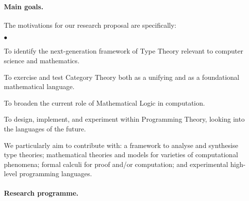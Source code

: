 \documentclass[11pt,twocolumn]{article}
\newenvironment{myitemize}
  {\begin{list}{$\bullet$}
  {\setlength{\topsep}{1pt}
   \setlength{\partopsep}{1pt}
   \setlength{\itemsep}{0pt}
   \setlength{\parsep}{0pt}
   \setlength{\leftmargin}{1em}
   \setlength{\labelwidth}{.5em}}}
  {\end{list}}
\begin{document}
\paragraph*{Main goals.}

The motivations for our research proposal are specifically: 
\begin{myitemize}
\item[\raisebox{.75mm}{\tiny$\bigstar$}]\hspace*{-2mm}
  To identify the next-generation framework of Type Theory relevant to
  computer science and mathematics.
\item[\raisebox{.75mm}{\tiny$\bigstar$}]\hspace*{-2mm}
  To exercise and test Category Theory both as a unifying and as a
  foundational mathematical language.
\item[\raisebox{.75mm}{\tiny$\bigstar$}]\hspace*{-2mm}
  To broaden the current role of Mathematical Logic in computation.
\item[\raisebox{.75mm}{\tiny$\bigstar$}]\hspace*{-2mm}
  To design, implement, and experiment within Programming Theory, looking
  into the languages of the future.
\end{myitemize}

We particularly aim to contribute with: a framework to analyse and synthesise
type theories; mathematical theories and models for varieties of computational
phenomena; formal calculi for proof and/or computation; and experimental
high-level programming languages.

\paragraph*{Research programme.}
\end{document}
